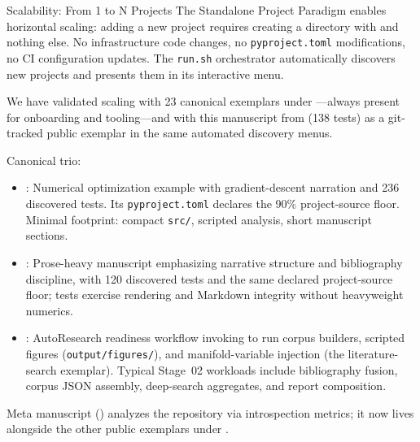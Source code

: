 \documentclass[
  ignorenonframetext,
]{beamer}
\author{\texorpdfstring{}{}}
\date{}
\providecommand{\tightlist}{%
  \setlength{\itemsep}{0pt}\setlength{\parskip}{0pt}}
\begin{document}
\begin{frame}{Scalability: From 1 to N
Projects}
\protect{}\label{scalability-from-1-to-n-projects}
The Standalone Project Paradigm enables horizontal scaling: adding a new
project requires creating a directory with
 and nothing else. No infrastructure code
changes, no \texttt{pyproject.toml} modifications, no CI configuration
updates. The \texttt{run.sh} orchestrator automatically discovers new
projects and presents them in its interactive menu.

We have validated scaling with 23 canonical exemplars under
---always present for onboarding and
tooling---and with this manuscript from
 (138 tests) as a
git-tracked public exemplar in the same automated discovery menus.

Canonical trio:

\begin{itemize}
\tightlist
\item
  \textbf{}: Numerical optimization
  example with gradient-descent narration and 236 discovered tests. Its
  \texttt{pyproject.toml} declares the 90\% project-source floor.
  Minimal footprint: compact \texttt{src/}, scripted analysis, short
  manuscript sections.
\item
  \textbf{}: Prose-heavy manuscript
  emphasizing narrative structure and bibliography discipline, with 120
  discovered tests and the same declared project-source floor; tests
  exercise rendering and Markdown integrity without heavyweight
  numerics.
\item
  \textbf{}: AutoResearch
  readiness workflow invoking
   to run
  corpus builders, scripted figures (\texttt{output/figures/}), and
  manifold-variable injection (the literature-search exemplar). Typical
  Stage~02 workloads include bibliography fusion, corpus JSON assembly,
  deep-search aggregates, and report composition.
\end{itemize}

Meta manuscript
(\textbf{}) analyzes the
repository via  introspection metrics;
it now lives alongside the other public exemplars under
.


\end{frame}
\end{document}
